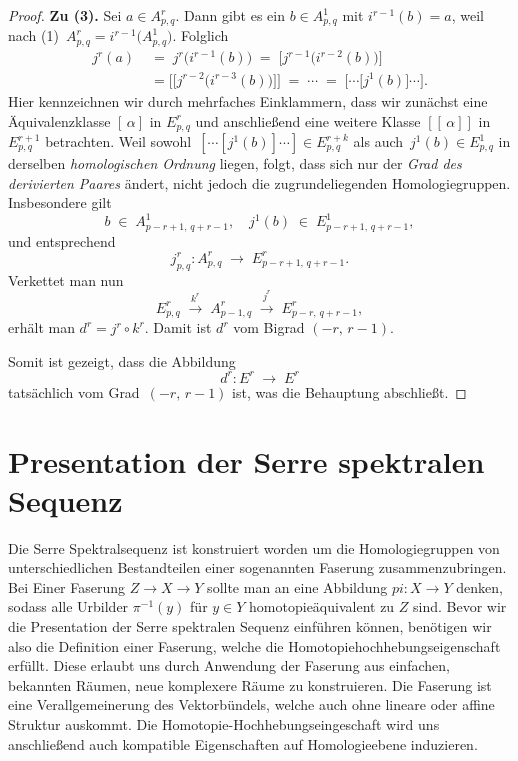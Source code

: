 \documentclass[12pt, hidelinks]{article}
\numberwithin{conj}{section}
\begin{document}
\begin{proof}
\smallskip
\noindent
\textbf{Zu (3).} Sei \(a \in A^r_{p,q}\). Dann gibt es ein \(b \in A^1_{p,q}\) mit \(i^{r-1}(b) = a\), weil nach (1) \(\,A^r_{p,q} = i^{r-1}\bigl(A^1_{p,q}\bigr)\). Folglich
\begin{align}
    j^r(a)
    &\;=\;
    j^r\bigl(i^{r-1}(b)\bigr)
    \;=\;
    \bigl[j^{r-1}\bigl(i^{r-2}(b)\bigr)\bigr] \\\nonumber
    &\;= \bigl[\bigl[j^{r-2}\bigl(i^{r-3}(b)\bigr)\bigr]\bigr]
    \;=\;
    \cdots
    \;=\;
    \bigl[\cdots \bigl[j^1(b)\bigr]\cdots\bigr].
\end{align}
Hier kennzeichnen wir durch mehrfaches Einklammern, dass wir zunächst eine Äquivalenzklasse \([\,\alpha]\) in \(E^r_{p,q}\) und anschließend eine weitere Klasse \([[\,\alpha]]\) in \(E^{r+1}_{p,q}\) betrachten. Weil sowohl
\(\,[\cdots [j^1(b)] \cdots] \in E^{r+k}_{p,q}\) 
als auch 
\(\,j^1(b) \in E^1_{p,q}\)
in derselben \emph{homologischen Ordnung} liegen, folgt, dass sich nur der \emph{Grad des derivierten Paares} ändert, nicht jedoch die zugrundeliegenden Homologiegruppen. Insbesondere gilt
\[
    b \;\in\; A^1_{p-r+1,\,q+r-1},
    \quad
    j^1(b) \;\in\; E^1_{p-r+1,\,q+r-1},
\]
und entsprechend
\[
    j^r_{p,q} : A^r_{p,q} \;\longrightarrow\; E^r_{p-r+1,\,q+r-1}.
\]
Verkettet man nun
\[
    E^r_{p,q} \;\xrightarrow{k^r}\; A^r_{p-1,q}
    \;\xrightarrow{j^r}\; E^r_{p-r,\,q+r-1},
\]
erhält man \(d^r = j^r \circ k^r\). Damit ist \(d^r\) vom Bigrad \((-r,\,r-1)\).

\bigskip

\noindent
Somit ist gezeigt, dass die Abbildung
\[
    d^r : E^r \;\longrightarrow\; E^r
\]
tatsächlich vom Grad \(\,(-r,\,r-1)\) ist, was die Behauptung abschließt.
\end{proof}

\section{Presentation der Serre spektralen Sequenz}
Die Serre Spektralsequenz ist konstruiert worden um die Homologiegruppen von unterschiedlichen Bestandteilen einer sogenannten Faserung zusammenzubringen. Bei Einer Faserung $Z \to X \to Y$ sollte man an eine Abbildung $pi: X \to Y$ denken, sodass alle Urbilder $\pi^{-1}(y)$ für $y \in Y$ homotopieäquivalent zu $Z$ sind. Bevor wir die Presentation der Serre spektralen Sequenz einführen können, benötigen wir also die Definition einer Faserung, welche die Homotopiehochhebungseigenschaft erfüllt. Diese erlaubt uns durch Anwendung der Faserung aus einfachen, bekannten Räumen, neue komplexere Räume zu konstruieren. Die Faserung ist eine Verallgemeinerung des Vektorbündels, welche auch ohne lineare oder affine Struktur auskommt. Die Homotopie-Hochhebungseingeschaft wird uns anschließend auch kompatible Eigenschaften auf Homologieebene induzieren.
\end{document}

